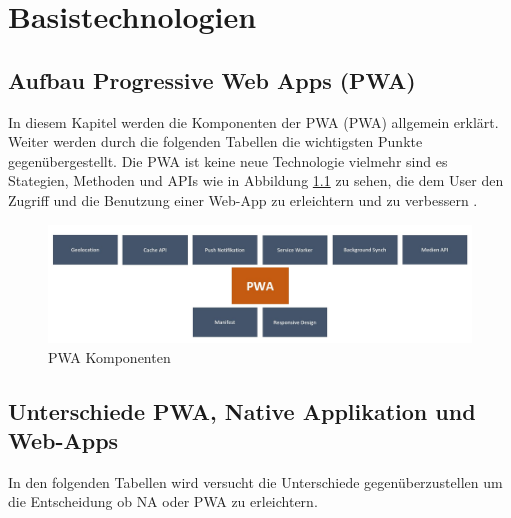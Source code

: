 \chapter{Basistechnologien}\label{chab:Basistechnologien}
\thispagestyle{standard}
\pagestyle{standard}
\renewcommand{\footrulewidth}{0.4pt}

\section{Aufbau Progressive Web Apps (PWA)}
In diesem Kapitel werden die Komponenten der \acl{PWA} (\acs{PWA}) allgemein erklärt. Weiter werden durch die folgenden Tabellen die wichtigsten Punkte gegenübergestellt. Die \acs{PWA} ist keine neue Technologie vielmehr sind es Stategien, Methoden und APIs wie in Abbildung \ref{fig:Komponenten} zu sehen, die dem User den Zugriff und die Benutzung einer \acs{Web-App} zu erleichtern und zu verbessern \cite{AlternativePWA}.
  

\begin{figure}[h]
	\centering
	\includegraphics[width=14cm]{BilderAllgemein/PWA_Features}\medskip
	\caption{PWA Komponenten}
	\label{fig:Komponenten}
\end{figure}

\section{Unterschiede PWA, Native Applikation und Web-Apps}\label{chap:UnterschiedePWA,NativeApplikationundWeb-Apps}
In den folgenden Tabellen wird versucht die Unterschiede gegenüberzustellen um die Entscheidung ob \acs{NA} oder \acs{PWA} zu erleichtern.


